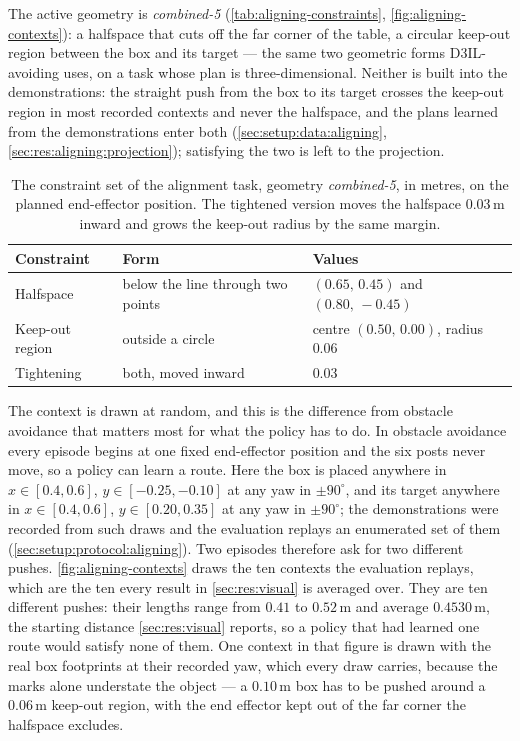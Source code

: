 The active geometry is \emph{combined-5} (\autoref{tab:aligning-constraints},
\autoref{fig:aligning-contexts}): a halfspace that cuts off the far corner of the table, a circular
keep-out region between the box and its target --- the same two geometric forms D3IL-avoiding uses, on a
task whose plan is three-dimensional. Neither is built into the demonstrations: the straight push from
the box to its target crosses the keep-out region in most recorded contexts and never the halfspace, and
the plans learned from the demonstrations enter both (\autoref{sec:setup:data:aligning},
\autoref{sec:res:aligning:projection}); satisfying the two is left to the projection.

\begin{table}[htpb]
  \caption[Constraint set of the alignment task]{The constraint set of the alignment task, geometry
  \emph{combined-5}, in metres, on the planned end-effector position. The tightened version moves the
  halfspace $0.03$\,m inward and grows the keep-out radius by the same margin.}
  \label{tab:aligning-constraints}
  \centering
  \small
  \setlength{\tabcolsep}{8pt}
  \renewcommand{\arraystretch}{1.2}
  \begin{tabularx}{\linewidth}{@{}l>{\raggedright\arraybackslash}p{3.9cm} X@{}}
    \toprule
    Constraint & Form & Values \\
    \midrule
    Halfspace & below the line through two points & $(0.65,\,0.45)$ and $(0.80,\,-0.45)$ \\
    Keep-out region & outside a circle & centre $(0.50,\,0.00)$, radius $0.06$ \\
    Tightening & both, moved inward & $0.03$ \\
    \bottomrule
  \end{tabularx}
\end{table}

The context is drawn at random, and this is the difference from obstacle avoidance that matters most for
what the policy has to do. In obstacle avoidance every episode begins at one fixed end-effector position
and the six posts never move, so a policy can learn a route. Here the box is placed anywhere in
$x\in[0.4,0.6]$, $y\in[-0.25,-0.10]$ at any yaw in $\pm 90^{\circ}$, and its target anywhere in
$x\in[0.4,0.6]$, $y\in[0.20,0.35]$ at any yaw in $\pm 90^{\circ}$; the demonstrations were recorded from
such draws and the evaluation replays an enumerated set of them (\autoref{sec:setup:protocol:aligning}).
Two episodes therefore ask for two different pushes. \autoref{fig:aligning-contexts} draws the ten
contexts the evaluation replays, which are the ten every result in \autoref{sec:res:visual} is averaged
over. They are ten different pushes: their lengths range from $0.41$ to $0.52$\,m and average
$0.4530$\,m, the starting distance \autoref{sec:res:visual} reports, so a policy that had learned one
route would satisfy none of them. One context in that figure is drawn with the real box footprints at
their recorded yaw, which every draw carries, because the marks alone understate the object --- a
$0.10$\,m box has to be pushed around a $0.06$\,m keep-out region, with the end effector kept out of the
far corner the halfspace excludes.

